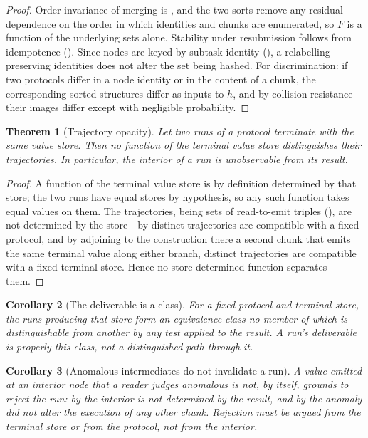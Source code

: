 \documentclass[11pt,a4paper]{article}
\theoremstyle{thmstyle}
\newtheorem{theorem}{Theorem}[section]
\newtheorem{corollary}[theorem]{Corollary}
\theoremstyle{definition}
\theoremstyle{remark}
\begin{document}
\begin{proof}
Order-invariance of merging is , and the two
sorts remove any residual dependence on the order in which identities and
chunks are enumerated, so $F$ is a function of the underlying sets alone.
Stability under resubmission follows from idempotence
(). Since nodes are keyed by subtask identity
(), a relabelling preserving identities does not alter the
set being hashed. For discrimination: if two protocols differ in a node
identity or in the content of a chunk, the corresponding sorted structures
differ as inputs to $h$, and by collision resistance their images differ
except with negligible probability.
\end{proof}

\begin{theorem}[Trajectory opacity]
\label{thm:opacity}
Let two runs of a protocol terminate with the same value store. Then no
function of the terminal value store distinguishes their trajectories. In
particular, the interior of a run is unobservable from its result.
\end{theorem}

\begin{proof}
A function of the terminal value store is by definition determined by that
store; the two runs have equal stores by hypothesis, so any such function
takes equal values on them. The trajectories, being sets of read-to-emit
triples (), are not determined by the store---by
 distinct trajectories are compatible with a fixed
protocol, and by adjoining to the construction there a second chunk that
emits the same terminal value along either branch, distinct trajectories are
compatible with a fixed terminal store. Hence no store-determined function
separates them.
\end{proof}

\begin{corollary}[The deliverable is a class]
\label{cor:class}
For a fixed protocol and terminal store, the runs producing that store form
an equivalence class no member of which is distinguishable from another by
any test applied to the result. A run's deliverable is properly this class,
not a distinguished path through it.
\end{corollary}

\begin{corollary}[Anomalous intermediates do not invalidate a run]
\label{cor:weird}
A value emitted at an interior node that a reader judges anomalous is not,
by itself, grounds to reject the run: by  the interior is
not determined by the result, and by  the anomaly did
not alter the execution of any other chunk. Rejection must be argued from
the terminal store or from the protocol, not from the interior.
\end{corollary}
\end{document}
